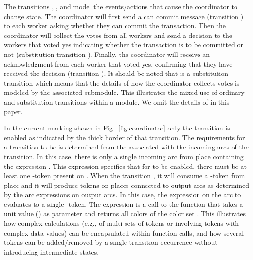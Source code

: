 The transitions , , and
 model the
events/actions that cause the coordinator to change state. The
coordinator will first send a can commit message (transition
) to each worker asking whether they can commit
the transaction. Then the coordinator will collect the votes from all
workers and send a decision to the workers that voted yes indicating
whether the transaction is to be committed or not (substitution
transition ). Finally, the coordinator will
receive an acknowledgment from each worker that voted yes, confirming
that they have received the decision (transition
).  It should be noted that
 is a substitution transition which means that
the details of how the coordinator collects votes is modeled by the
associated  submodule. This illustrates the
mixed use of ordinary and substitution transitions within a module. We
omit the details of  in this paper.


In the current marking shown in Fig.~\ref{fig:coordinator} only the
transition  is enabled as indicated by the
thick border of that transition. The requirements for a transition to
be  is determined from the 
associated with the incoming arcs of the transition. In this case,
there is only a single incoming arc from place 
containing the expression \smlcode{()}. This expression specifies that
for  to be enabled, there must be at least one
\smlcode{()}-token present on . When the
 transition , it will consume a
\smlcode{()}-token from place  and it will produce
tokens on places connected to output arcs as determined by
 the arc expressions on output arcs. In this case,
the expression \smlcode{()} on the arc to 
evaluates to a single \smlcode{()}-token. The expression
 is a call to the function 
that takes a unit value (\smlcode{()}) as parameter and returns all
colors of the color set . This illustrates how complex
calculations (e.g., of multi-sets of tokens or involving tokens with
complex data values) can be encapsulated within function calls, and
how several tokens can be added/removed by a single transition
occurrence without introducing intermediate states.

